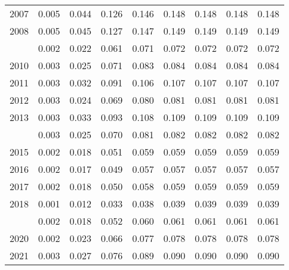 \documentclass[
]{article}
\begin{document}
\begin{longtable}[t]{lrrrrrrrr}
2007 & 0.005 & 0.044 & 0.126 & 0.146 & 0.148 & 0.148 & 0.148 & 0.148\\
2008 & 0.005 & 0.045 & 0.127 & 0.147 & 0.149 & 0.149 & 0.149 & 0.149\\
\addlinespace
2009 & 0.002 & 0.022 & 0.061 & 0.071 & 0.072 & 0.072 & 0.072 & 0.072\\
2010 & 0.003 & 0.025 & 0.071 & 0.083 & 0.084 & 0.084 & 0.084 & 0.084\\
2011 & 0.003 & 0.032 & 0.091 & 0.106 & 0.107 & 0.107 & 0.107 & 0.107\\
2012 & 0.003 & 0.024 & 0.069 & 0.080 & 0.081 & 0.081 & 0.081 & 0.081\\
2013 & 0.003 & 0.033 & 0.093 & 0.108 & 0.109 & 0.109 & 0.109 & 0.109\\
\addlinespace
2014 & 0.003 & 0.025 & 0.070 & 0.081 & 0.082 & 0.082 & 0.082 & 0.082\\
2015 & 0.002 & 0.018 & 0.051 & 0.059 & 0.059 & 0.059 & 0.059 & 0.059\\
2016 & 0.002 & 0.017 & 0.049 & 0.057 & 0.057 & 0.057 & 0.057 & 0.057\\
2017 & 0.002 & 0.018 & 0.050 & 0.058 & 0.059 & 0.059 & 0.059 & 0.059\\
2018 & 0.001 & 0.012 & 0.033 & 0.038 & 0.039 & 0.039 & 0.039 & 0.039\\
\addlinespace
2019 & 0.002 & 0.018 & 0.052 & 0.060 & 0.061 & 0.061 & 0.061 & 0.061\\
2020 & 0.002 & 0.023 & 0.066 & 0.077 & 0.078 & 0.078 & 0.078 & 0.078\\
2021 & 0.003 & 0.027 & 0.076 & 0.089 & 0.090 & 0.090 & 0.090 & 0.090\\*
\end{longtable}
\end{document}
